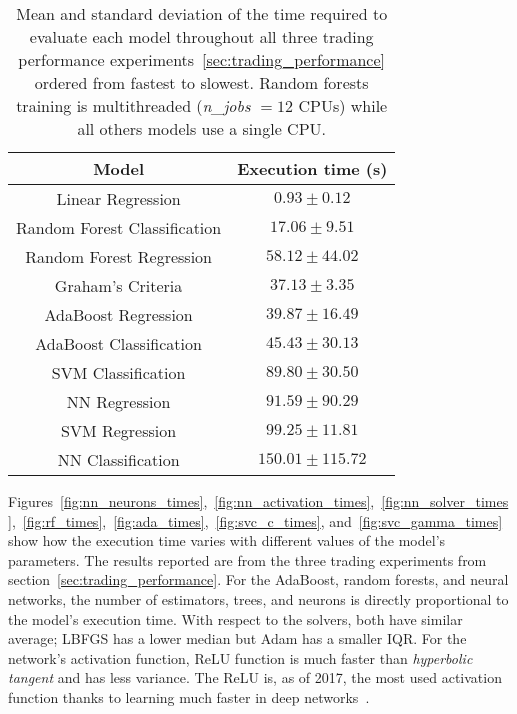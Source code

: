 \begin{table}
\centering
    \begin{tabular}{|c|c|}
    \hline
    Model                        & Execution time (s)                       \\ \hline
    Linear Regression            & $0.93 \pm 0.12$     \\
    Random Forest Classification & $17.06 \pm 9.51$     \\
    Random Forest Regression     & $58.12 \pm 44.02$   \\
    Graham's Criteria            & $37.13 \pm 3.35$    \\
    AdaBoost Regression          & $39.87 \pm 16.49$   \\
    AdaBoost Classification      & $45.43 \pm 30.13$   \\
    SVM Classification           & $89.80 \pm 30.50$   \\
    NN Regression                & $91.59  \pm 90.29$  \\
    SVM Regression               & $99.25  \pm 11.81$  \\
    NN Classification            & $150.01 \pm 115.72$ \\ \hline
    \end{tabular}
    \caption{Mean and standard deviation of the time required to evaluate each model throughout all three trading performance experiments~\ref{sec:trading_performance} ordered from fastest to slowest. Random forests training is multithreaded (\textit{n\_jobs} $=12$ CPUs) while all others models use a single CPU.}
    \label{tab:times_model}
\end{table}

Figures~\ref{fig:nn_neurons_times},~\ref{fig:nn_activation_times},~\ref{fig:nn_solver_times},~\ref{fig:rf_times},~\ref{fig:ada_times},~\ref{fig:svc_c_times}, and~\ref{fig:svc_gamma_times} show how the execution time varies with different values of the model's parameters. The results reported are from the three trading experiments from section~\ref{sec:trading_performance}. For the AdaBoost, random forests, and neural networks, the number of estimators, trees, and neurons is directly proportional to the model's execution time. With respect to the solvers, both have similar average; LBFGS has a lower median but Adam has a smaller IQR. For the network's activation function, ReLU function is much faster than \textit{hyperbolic tangent} and has less variance. The ReLU is, as of 2017, the most used activation function thanks to learning much faster in deep networks~\cite{deeplearning}.


